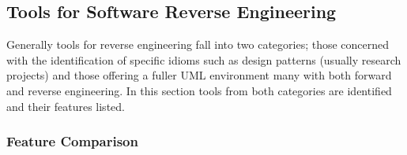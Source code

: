 \clearpage
\subsection{Tools for Software Reverse Engineering}\label{lit-reverseengineering-tools}

Generally tools for reverse engineering fall into two categories; those concerned with the identification of specific idioms such as design patterns (usually research projects) and those offering a fuller UML environment many with both forward and reverse engineering. In this section tools from both categories are identified and their features listed.

\subsubsection{Feature Comparison}\label{lit-reverseengineering-toolfeatures}

